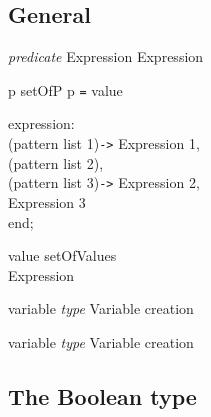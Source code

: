 
\subsection{General}
\begin{description}
\item {} \textit{predicate}  Expression  Expression

\item {} p  setOfP \keyw{\&} p {\tt =} value

\item {} expression:\\
      (pattern list 1){\tt ->} Expression 1,\\
      (pattern list 2),\\
      (pattern list 3){\tt ->} Expression 2,\\
        Expression 3\\
   \noindent end;

\item {} value  setOfValues\\
       Expression

\item {} variable \textit{\keyw{:} type} \keyw{:=} Variable creation \keyw{;}

\item {} variable \textit{\keyw{:} type} \keyw{=} Variable creation 
\end{description}



\subsection{The Boolean type}\label{bool}



